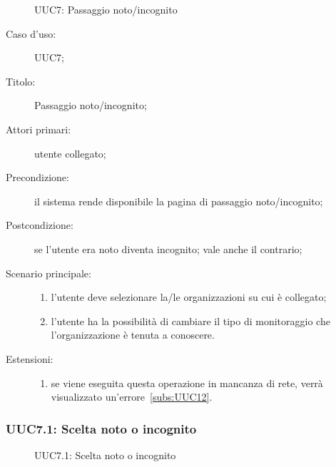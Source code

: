 \documentclass[../../../analisi-dei-requisiti.tex]{subfiles}
\begin{document}
\begin{figure}[H]
  \centering
  \caption{UUC7: Passaggio noto/incognito}%
  \label{fig:uuc7}
\end{figure}

\begin{description}
  \item[Caso d’uso:] UUC7;
  \item[Titolo:] Passaggio noto/incognito;
  \item[Attori primari:] utente collegato;
  \item[Precondizione:] il sistema rende disponibile la pagina di passaggio noto/incognito;
  \item[Postcondizione:] se l'utente era noto diventa incognito; vale anche il contrario;
  \item[Scenario principale:]
        \begin{enumerate}
          \item l'utente deve selezionare la/le organizzazioni su cui è collegato;
          \item l'utente ha la possibilità di cambiare il tipo di monitoraggio che l'organizzazione è tenuta a conoscere.
        \end{enumerate}
  \item[Estensioni:]
        \begin{enumerate}
          \item se viene eseguita questa operazione in mancanza di rete, verrà visualizzato un'errore~\ref{subs:UUC12}.
        \end{enumerate}
\end{description}

\subsubsection{UUC7.1: Scelta noto o incognito}%
\label{subs:UUC7.1}

\begin{figure}[H]
  \centering
  \caption{UUC7.1: Scelta noto o incognito}%
  \label{fig:uuc7_1}
\end{figure}
\end{document}
